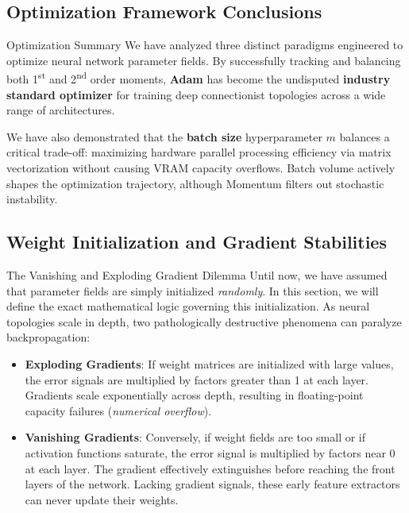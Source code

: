 \subsection[Optimization Framework Conclusions]{Optimization Framework Conclusions}

\begin{frame}{Optimization Summary}
	We have analyzed three distinct paradigms engineered to optimize neural network parameter fields. By successfully tracking and balancing both 1\textsuperscript{st} and 2\textsuperscript{nd} order moments, \textbf{Adam} has become the undisputed \textbf{industry standard optimizer} for training deep connectionist topologies across a wide range of architectures.
	
	\pause
	\vspace{0.5cm}
	We have also demonstrated that the \textbf{batch size} hyperparameter $m$ balances a critical trade-off: maximizing hardware parallel processing efficiency via matrix vectorization without causing VRAM capacity overflows. Batch volume actively shapes the optimization trajectory, although Momentum filters out stochastic instability.
\end{frame}

\subsection[Weight Initialization and Gradient Stabilities]{Weight Initialization and Gradient Stabilities}

\begin{frame}{The Vanishing and Exploding Gradient Dilemma}
	Until now, we have assumed that parameter fields are simply initialized \textit{randomly}. In this section, we will define the exact mathematical logic governing this initialization. As neural topologies scale in depth, two pathologically destructive phenomena can paralyze backpropagation:
	\pause
	\begin{itemize}
		\item \textbf{Exploding Gradients}: If weight matrices are initialized with large values, the error signals are multiplied by factors greater than 1 at each layer. Gradients scale exponentially across depth, resulting in floating-point capacity failures (\textit{numerical overflow}).
		\pause
		\item \textbf{Vanishing Gradients}: Conversely, if weight fields are too small or if activation functions saturate, the error signal is multiplied by factors near 0 at each layer. The gradient effectively extinguishes before reaching the front layers of the network. Lacking gradient signals, these early feature extractors can never update their weights.
	\end{itemize}
\end{frame}

